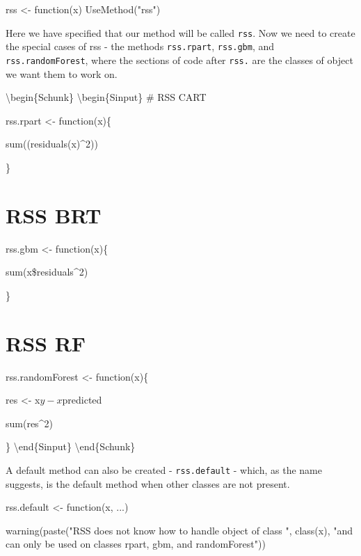 \begin{Schunk}
\begin{Sinput}
rss <- function(x) UseMethod("rss")
\end{Sinput}
\end{Schunk}

Here we have specified that our method will be called \texttt{rss}. Now
we need to create the special cases of rss - the methods
\texttt{rss.rpart}, \texttt{rss.gbm}, and \texttt{rss.randomForest},
where the sections of code after \texttt{rss.} are the classes of object
we want them to work on.

\textbackslash{}begin\{Schunk\} \textbackslash{}begin\{Sinput\} \# RSS
CART

rss.rpart \textless{}- function(x)\{

sum((residuals(x)\^{}2))

\}

\section{RSS BRT}\label{rss-brt}

rss.gbm \textless{}- function(x)\{

sum(x\$residuals\^{}2)

\}

\section{RSS RF}\label{rss-rf}

rss.randomForest \textless{}- function(x)\{

res \textless{}- x\(y - x\)predicted

sum(res\^{}2)

\} \textbackslash{}end\{Sinput\} \textbackslash{}end\{Schunk\}

A default method can also be created - \texttt{rss.default} - which, as
the name suggests, is the default method when other classes are not
present.

\begin{Schunk}
\begin{Sinput}
rss.default <- function(x, ...){
  
  warning(paste("RSS does not know how to handle object of class ", class(x), "and can only be used on classes rpart, gbm, and randomForest"))
          
          }
\end{Sinput}
\end{Schunk}

